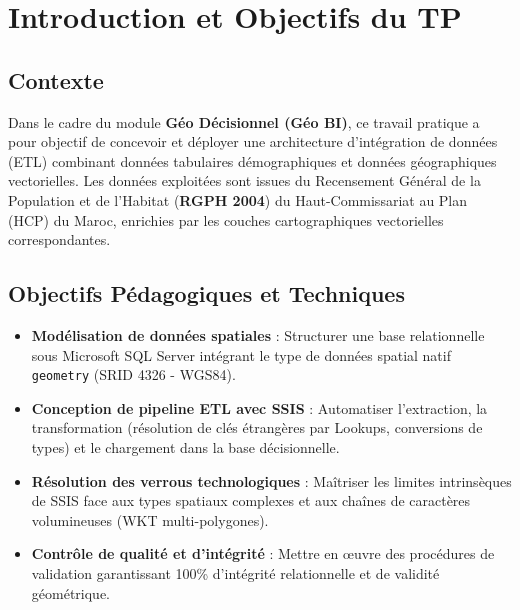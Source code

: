 \documentclass[12pt,a4paper]{article}
\begin{document}
\section{Introduction et Objectifs du TP}

\subsection{Contexte}
Dans le cadre du module \textbf{Géo Décisionnel (Géo BI)}, ce travail pratique a pour objectif de concevoir et déployer une architecture d'intégration de données (ETL) combinant données tabulaires démographiques et données géographiques vectorielles. Les données exploitées sont issues du Recensement Général de la Population et de l'Habitat (\textbf{RGPH 2004}) du Haut-Commissariat au Plan (HCP) du Maroc, enrichies par les couches cartographiques vectorielles correspondantes.

\subsection{Objectifs Pédagogiques et Techniques}
\begin{itemize}[leftmargin=1.5cm]
    \item \textbf{Modélisation de données spatiales} : Structurer une base relationnelle sous Microsoft SQL Server intégrant le type de données spatial natif \texttt{geometry} (SRID 4326 - WGS84).
    \item \textbf{Conception de pipeline ETL avec SSIS} : Automatiser l'extraction, la transformation (résolution de clés étrangères par Lookups, conversions de types) et le chargement dans la base décisionnelle.
    \item \textbf{Résolution des verrous technologiques} : Maîtriser les limites intrinsèques de SSIS face aux types spatiaux complexes et aux chaînes de caractères volumineuses (WKT multi-polygones).
    \item \textbf{Contrôle de qualité et d'intégrité} : Mettre en œuvre des procédures de validation garantissant 100\% d'intégrité relationnelle et de validité géométrique.
\end{itemize}

\end{document}
